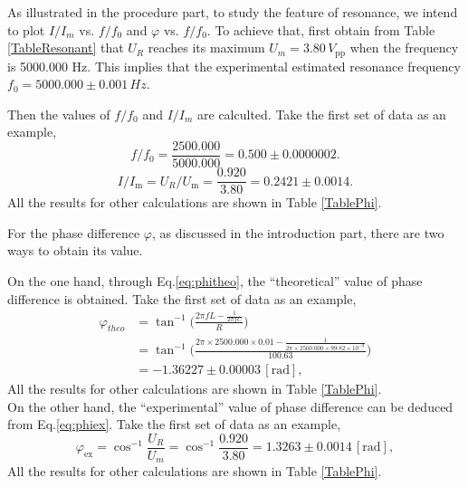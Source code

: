 \documentclass{article}
\begin{document}
As illustrated in the procedure part, to study the feature of resonance, we intend to plot $I/I_m$ vs. $f/f_0$ and $\varphi$ vs. $f/f_0$. To achieve that, first obtain from Table \ref{TableResonant} that $U_R$ reaches its maximum $U_m = 3.80\,V_{\text{pp}}$ when the frequency is 5000.000 Hz. This implies that the experimental estimated resonance frequency $f_0 = 5000.000\pm 0.001\,Hz$.

Then the values of $f/f_0$ and $I/I_m$ are calculted. Take the first set of data as an example,
$$f/f_0 = \frac{2500.000}{5000.000} = 0.500 \pm 0.0000002.$$
$$I/I_\text{m} = U_R/U_\text{m} = \frac{0.920}{3.80} = 0.2421 \pm 0.0014.$$
All the results for other calculations are shown in Table \ref{TablePhi}.

For the phase difference $\varphi$, as discussed in the introduction part, there are two ways to obtain its value.

On the one hand, through Eq.\eqref{eq:phitheo}, the ``theoretical'' value of phase difference is obtained. Take the first set of data as an example,
\begin{align*}
    \varphi_{theo} & = \tan^{-1}\bigg(\frac{2\pi fL - \frac{1}{2\pi fC}}{R}\bigg)                                                                 \\
                   & = \tan^{-1}\bigg(\frac{2\pi\times 2500.000\times 0.01-\frac{1}{2\pi \times 2500.000\times 99.82\times10^{-9}}}{100.63}\bigg) \\
                   & =  -1.36227 \pm 0.00003 \,[\text{rad}],
\end{align*}
All the results for other calculations are shown in Table \ref{TablePhi}.\\

On the other hand, the ``experimental'' value of phase difference can be deduced from Eq.\eqref{eq:phiex}. Take the first set of data as an example,
$$\varphi_\text{ex} = \cos^{-1}\frac{U_R}{U_m} = \cos^{-1}\frac{0.920}{3.80} = 1.3263 \pm 0.0014 \,[\text{rad}],$$
All the results for other calculations are shown in Table \ref{TablePhi}.
\end{document}
